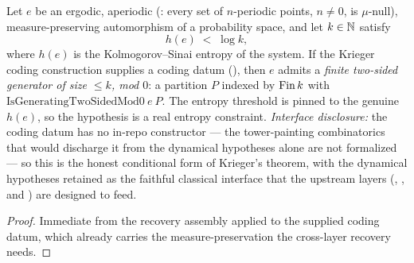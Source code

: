 \begin{theorem}\label{krieger_finite_generator}
  \leanok
  Let \(e\) be an ergodic, aperiodic (: every set of
  \(n\)-periodic points, \(n \ne 0\), is \(\mu\)-null), measure-preserving automorphism of a
  probability space, and let \(k \in \mathbb{N}\) satisfy
  \[
    h(e) \;<\; \log k,
  \]
  where \(h(e)\) is the Kolmogorov--Sinai entropy of the system. If the Krieger coding
  construction supplies a coding datum (), then \(e\) admits a
  \emph{finite two-sided generator of size \(\le k\), mod \(0\)}: a partition
  \(P\) indexed by \(\operatorname{Fin} k\) with \(\mathrm{IsGeneratingTwoSidedMod0}\ e\ P\). The
  entropy threshold is pinned to the genuine \(h(e)\), so the hypothesis is a real entropy
  constraint. \emph{Interface disclosure:} the coding datum has no in-repo constructor --- the
  tower-painting combinatorics that would discharge it from the dynamical hypotheses alone are not
  formalized --- so this is the honest conditional form of Krieger's theorem, with the dynamical
  hypotheses retained as the faithful classical interface that the upstream layers
  (, ,  and
  ) are designed to feed.
\end{theorem}
\begin{proof}\leanok
  Immediate from the recovery assembly  applied to the
  supplied coding datum, which already carries the measure-preservation the cross-layer recovery
  needs.
\end{proof}
